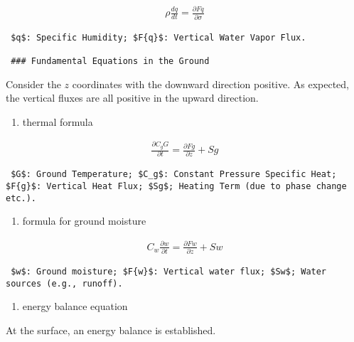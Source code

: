 \begin{eqnarray}
  \rho \frac{d {q}}{d {t}} = \frac{\partial{Fq}}{\partial {\sigma}}
\end{eqnarray}

\begin{verbatim}
 $q$: Specific Humidity; $F{q}$: Vertical Water Vapor Flux.

 ### Fundamental Equations in the Ground
\end{verbatim}

Consider the \(z\) coordinates with the downward direction positive. As
expected, the vertical fluxes are all positive in the upward direction.

\begin{enumerate}
\def\labelenumi{\arabic{enumi}.}
\setcounter{enumi}{3}
\tightlist
\item
  thermal formula
\end{enumerate}

\begin{eqnarray}
  \frac{\partial{C_g G}}{\partial {t}} = \frac{\partial{Fg}}{\partial {z}} + Sg
\end{eqnarray}

\begin{verbatim}
 $G$: Ground Temperature; $C_g$: Constant Pressure Specific Heat; $F{g}$: Vertical Heat Flux; $Sg$; Heating Term (due to phase change etc.).
\end{verbatim}

\begin{enumerate}
\def\labelenumi{\arabic{enumi}.}
\setcounter{enumi}{4}
\tightlist
\item
  formula for ground moisture
\end{enumerate}

\begin{eqnarray}
  C_w \frac{\partial{w}}{\partial {t}} = \frac{\partial{Fw}}{\partial {z}} + Sw
\end{eqnarray}

\begin{verbatim}
 $w$: Ground moisture; $F{w}$: Vertical water flux; $Sw$; Water sources (e.g., runoff).
\end{verbatim}

\begin{enumerate}
\def\labelenumi{\arabic{enumi}.}
\setcounter{enumi}{5}
\tightlist
\item
  energy balance equation
\end{enumerate}

At the surface, an energy balance is established.

